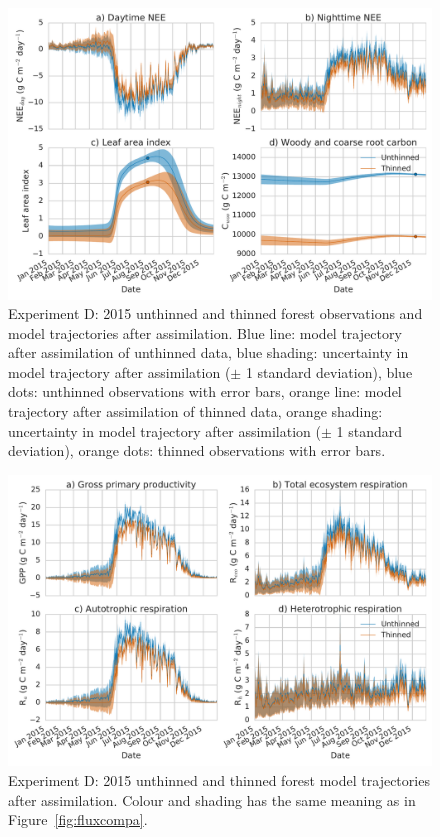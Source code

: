 \documentclass[draft,jgrga]{agutexSI}
\begin{document}
 
  \begin{figure}
 \noindent\includegraphics[width=40pc]{obs_compd.pdf}
\caption{Experiment D: 2015 unthinned and thinned forest observations and model trajectories after assimilation. Blue line: model trajectory after assimilation of unthinned data, blue shading: uncertainty in model trajectory after assimilation (\(\pm\) 1 standard deviation), blue dots: unthinned observations with error bars, orange line: model trajectory after assimilation of thinned data, orange shading: uncertainty in model trajectory after assimilation (\(\pm\) 1 standard deviation), orange dots: thinned observations with error bars.}
 \label{fig:obscompd}
 \end{figure}
 
 
 \begin{figure}
 \noindent\includegraphics[width=40pc]{flux_compd.pdf}
\caption{Experiment D: 2015 unthinned and thinned forest model trajectories after assimilation. Colour and shading has the same meaning as in Figure~\ref{fig:fluxcompa}.}
 \label{fig:fluxcompd}
 \end{figure}
 
\end{document}
